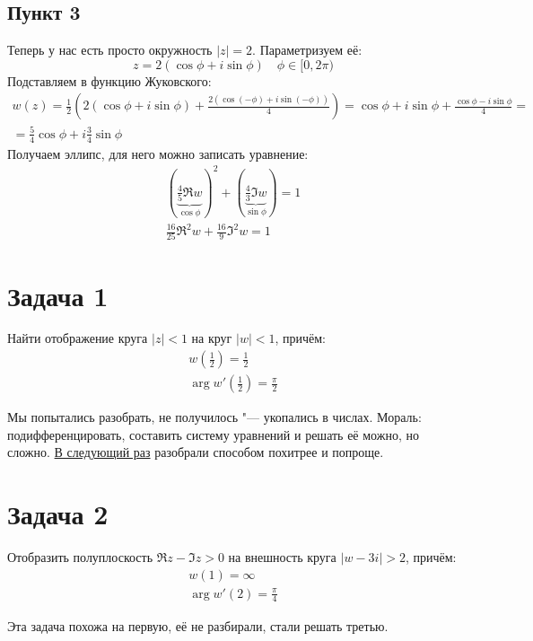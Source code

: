 	\subsection{Пункт 3}
		Теперь у нас есть просто окружность $|z|=2$.
		Параметризуем её:
		\[ z = 2(\cos \phi + i\sin \phi) \quad \phi \in [0, 2\pi) \]
		Подставляем в функцию Жуковского:
		\begin{gather*}
			w(z) =
				\frac12\left(2(\cos\phi + i\sin\phi) + \frac{2(\cos(-\phi) + i\sin(-\phi))}{4}\right) =
				\cos\phi + i\sin\phi + \frac{\cos\phi - i\sin\phi}{4} = \\
				= \frac54\cos\phi + i\frac34\sin\phi
		\end{gather*}
		Получаем эллипс, для него можно записать уравнение:
		\begin{gather*}
			\left(\underbrace{\frac45 \Re w}_{\cos\phi}\right)^2 + \left(\underbrace{\frac 43 \Im w}_{\sin\phi}\right) = 1 \\
			\frac{16}{25}\Re^2 w + \frac{16}{9}\Im^2 w = 1
		\end{gather*}

\section{Задача 1}\label{day160331_task1}
	Найти отображение круга $|z|<1$ на круг $|w|<1$, причём:
	\begin{gather*}
		w\left(\frac 12\right) = \frac12 \\
		\arg w'\left(\frac 12\right) = \frac \pi 2
	\end{gather*}

	Мы попытались разобрать, не получилось "--- укопались в числах.
	Мораль: подифференцировать, составить систему уравнений и решать её можно, но сложно.
	\hyperref[day160407_task1]{В следующий раз} разобрали способом похитрее и попроще.

\section{Задача 2}
	Отобразить полуплоскость $\Re z - \Im z > 0$ на внешность круга $|w-3i|>2$, причём:
	\begin{gather*}
		w(1) = \infty \\
		\arg w'(2) = \frac \pi 4
	\end{gather*}

	Эта задача похожа на первую, её не разбирали, стали решать третью.

